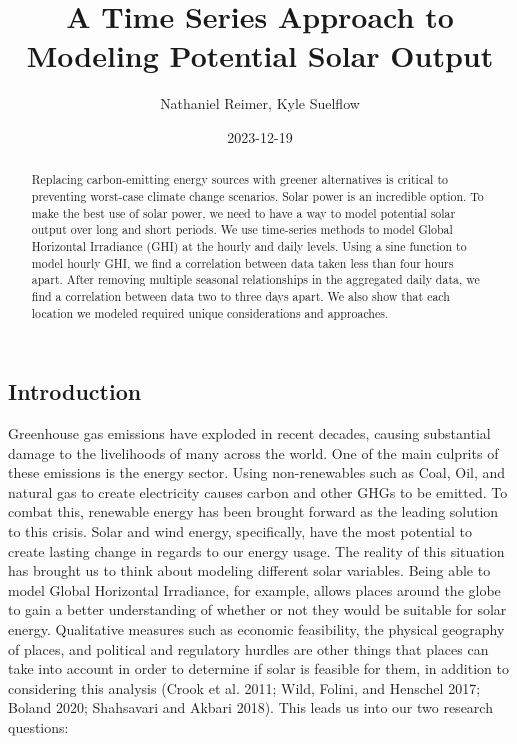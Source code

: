 \documentclass[
  letterpaper,
  DIV=11,
  numbers=noendperiod]{scrartcl}
\title{A Time Series Approach to Modeling Potential Solar Output}
\author{Nathaniel Reimer, Kyle Suelflow}
\date{2023-12-19}
\begin{document}
\maketitle
\begin{abstract}
Replacing carbon-emitting energy sources with greener alternatives is
critical to preventing worst-case climate change scenarios. Solar power
is an incredible option. To make the best use of solar power, we need to
have a way to model potential solar output over long and short periods.
We use time-series methods to model Global Horizontal Irradiance (GHI)
at the hourly and daily levels. Using a sine function to model hourly
GHI, we find a correlation between data taken less than four hours
apart. After removing multiple seasonal relationships in the aggregated
daily data, we find a correlation between data two to three days apart.
We also show that each location we modeled required unique
considerations and approaches.
\end{abstract}
\ifdefined\Shaded\renewenvironment{Shaded}{\begin{tcolorbox}[sharp corners, breakable, boxrule=0pt, interior hidden, frame hidden, borderline west={3pt}{0pt}{shadecolor}, enhanced]}{\end{tcolorbox}}\fi

\hypertarget{introduction}{%
\subsection{Introduction}\label{introduction}}

Greenhouse gas emissions have exploded in recent decades, causing
substantial damage to the livelihoods of many across the world. One of
the main culprits of these emissions is the energy sector. Using
non-renewables such as Coal, Oil, and natural gas to create electricity
causes carbon and other GHGs to be emitted. To combat this, renewable
energy has been brought forward as the leading solution to this crisis.
Solar and wind energy, specifically, have the most potential to create
lasting change in regards to our energy usage. The reality of this
situation has brought us to think about modeling different solar
variables. Being able to model Global Horizontal Irradiance, for
example, allows places around the globe to gain a better understanding
of whether or not they would be suitable for solar energy. Qualitative
measures such as economic feasibility, the physical geography of places,
and political and regulatory hurdles are other things that places can
take into account in order to determine if solar is feasible for them,
in addition to considering this analysis (Crook et al. 2011; Wild,
Folini, and Henschel 2017; Boland 2020; Shahsavari and Akbari 2018).
This leads us into our two research questions:
\end{document}
